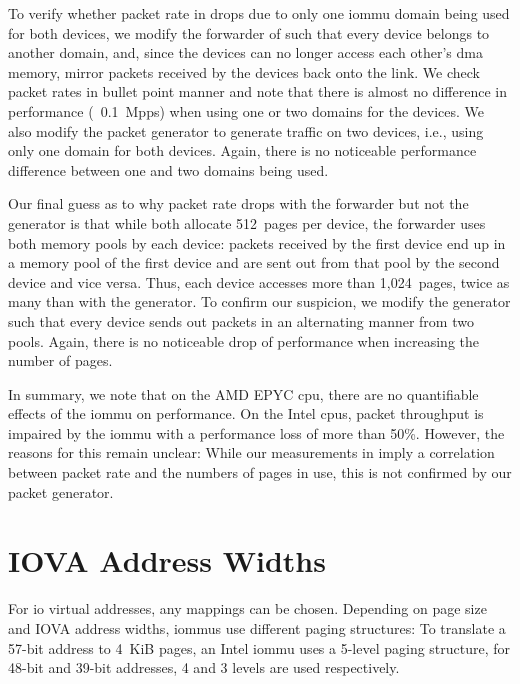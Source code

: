 To verify whether packet rate in  drops due to
only one \ac{iommu} domain being used for both devices, we modify the forwarder
of  such that every device belongs to another
domain, and, since the devices can no longer access each other's \ac{dma}
memory, mirror packets received by the devices back onto the link. We check
packet rates in bullet point manner and note that there is almost no difference
in performance (~0.1~Mpps) when using one or two domains for the devices. We
also modify the packet generator  to generate
traffic on two devices, i.e., using only one domain for both devices. Again,
there is no noticeable performance difference between one and two domains being
used.

Our final guess as to why packet rate drops with the forwarder but not the
generator is that while both allocate 512~pages per device, the forwarder uses
both memory pools by each device: packets received by the first device end up in
a memory pool of the first device and are sent out from that pool by the second
device and vice versa. Thus, each device accesses more than 1,024~pages, twice
as many than with the generator. To confirm our suspicion, we modify the
generator such that every device sends out packets in an alternating manner from
two pools. Again, there is no noticeable drop of performance when increasing the
number of pages.

In summary, we note that on the AMD EPYC \ac{cpu}, there are no quantifiable
effects of the \ac{iommu} on performance. On the Intel \acp{cpu}, packet
throughput is impaired by the \ac{iommu} with a performance loss of more than
50\%. However, the reasons for this remain unclear: While our measurements in
 imply a correlation between packet rate and the
numbers of pages in use, this is not confirmed by our packet generator.


\section{IOVA Address Widths}
\label{sec:iova_address_widths}

For \ac{io} virtual addresses, any mappings can be chosen. Depending on page
size and IOVA address widths, \acp{iommu} use different paging structures: To
translate a 57-bit address to 4~KiB pages, an Intel \ac{iommu} uses a 5-level
paging structure, for 48-bit and 39-bit addresses, 4 and 3 levels are used
respectively.

